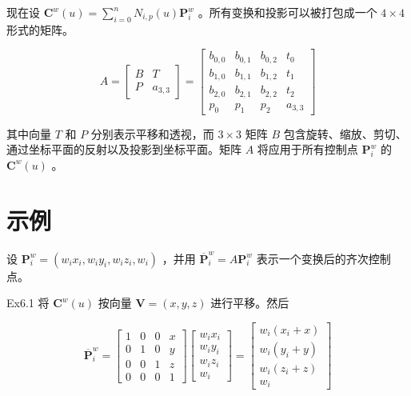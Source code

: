 \documentclass[../main.tex]{subfiles}
\begin{document}
现在设 \({\mathbf{C}}^{w}\left( u\right)  = \mathop{\sum }\limits_{{i = 0}}^{n}{N}_{i,p}\left( u\right) {\mathbf{P}}_{i}^{w}\) 。所有变换和投影可以被打包成一个 \(4 \times  4\) 形式的矩阵。

\[
A = \left\lbrack  \begin{array}{ll} B & T \\  P & {a}_{3,3} \end{array}\right\rbrack   = \left\lbrack  \begin{array}{llll} {b}_{0,0} & {b}_{0,1} & {b}_{0,2} & {t}_{0} \\  {b}_{1,0} & {b}_{1,1} & {b}_{1,2} & {t}_{1} \\  {b}_{2,0} & {b}_{2,1} & {b}_{2,2} & {t}_{2} \\  {p}_{0} & {p}_{1} & {p}_{2} & {a}_{3,3} \end{array}\right\rbrack   \tag{6.22}
\]

其中向量 \(T\) 和 \(P\) 分别表示平移和透视，而 \(3 \times  3\) 矩阵 \(B\) 包含旋转、缩放、剪切、通过坐标平面的反射以及投影到坐标平面。矩阵 \(A\) 将应用于所有控制点 \({\mathbf{P}}_{i}^{w}\) 的 \({\mathbf{C}}^{w}\left( u\right)\) 。

\section*{示例}

设 \({\mathbf{P}}_{i}^{w} = \left( {{w}_{i}{x}_{i},{w}_{i}{y}_{i},{w}_{i}{z}_{i},{w}_{i}}\right)\) ，并用 \({\overline{\mathbf{P}}}_{i}^{w} = A{\mathbf{P}}_{i}^{w}\) 表示一个变换后的齐次控制点。

Ex6.1 将 \({\mathbf{C}}^{w}\left( u\right)\) 按向量 \(\mathbf{V} = \left( {x,y,z}\right)\) 进行平移。然后

\[
{\overline{\mathbf{P}}}_{i}^{w} = \left\lbrack  \begin{array}{llll} 1 & 0 & 0 & x \\  0 & 1 & 0 & y \\  0 & 0 & 1 & z \\  0 & 0 & 0 & 1 \end{array}\right\rbrack  \left\lbrack  \begin{matrix} {w}_{i}{x}_{i} \\  {w}_{i}{y}_{i} \\  {w}_{i}{z}_{i} \\  {w}_{i} \end{matrix}\right\rbrack   = \left\lbrack  \begin{matrix} {w}_{i}\left( {{x}_{i} + x}\right) \\  {w}_{i}\left( {{y}_{i} + y}\right) \\  {w}_{i}\left( {{z}_{i} + z}\right) \\  {w}_{i} \end{matrix}\right\rbrack
\]
\end{document}
